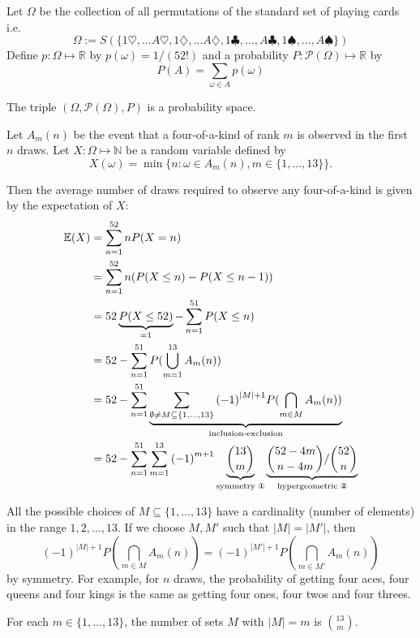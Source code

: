 \documentclass[6pt]{article}
\begin{document}
\begin{tcolorbox}[title=\text{The Standard Probability Space for Playing Cards}]
Let $\Omega$ be the collection of all permutations of the standard set of playing cards i.e.
  \[
      \Omega := S(\{1\heartsuit, \ldots A\heartsuit,1\diamondsuit,\ldots A\diamondsuit, 1\clubsuit,\ldots,A\clubsuit,1\spadesuit,\ldots,A\spadesuit\})
  \]
Define $p: \Omega \mapsto \mathbb{R}$ by $p(\omega) = 1/(52!)$
and a probability $P: \mathcal{P}(\Omega) \mapsto \mathbb{R}$  by
\[
    P(A) = \sum_{\omega \in A}p(\omega)
\]

The triple $(\Omega, \mathcal{P}(\Omega), P )$ is a probability space.
\end{tcolorbox}

\clearpage

\begin{tcolorbox}
Let $A_m(n)$ be the event that a four-of-a-kind of rank $m$ is observed in the first $n$ draws. Let
$X: \Omega \mapsto \mathbb{N}$ be a random variable defined by
\[
X(\omega) = \min \{ n : \omega \in A_m(n), m \in \{1, \ldots, 13\}\}.
\]

Then the average number of draws required to observe any four-of-a-kind is given by the expectation of $X$:
\begin{align*}
\mathbb{E}(X) &= \sum_{n = 1}^{52} n P(X  = n)\\
&= \sum_{n=1}^{52} n (P(X \leq n) - P(X \leq n -1)) \\
&= 52\underbrace{P(X \leq 52)}_{= 1} - \sum_{n=1}^{51} P(X\leq n) \\
&= 52 - \sum_{n=1}^{51} P(\bigcup_{m=1}^{13} A_m(n)) \\
& = 52 - \sum_{n=1}^{51} \underbrace{\sum_{\emptyset \neq M \subseteq \{1,\ldots,13\}} {(-1)}^{|M| + 1} P(\bigcap_{m \in M} A_m(n))}_{\text{inclusion-exclusion}} \\
& = 52 - \sum_{n = 1}^{51}\sum_{m = 1}^{13}  {(-1)}^{m+1}\underbrace{{13 \choose m}}_{\text{symmetry \ding{172}}} \underbrace{{52 -4m \choose n - 4m}/{52 \choose n}}_{\text{hypergeometric \ding{173}}} \\
\end{align*}
\end{tcolorbox}
\clearpage

\begin{tcolorbox}[title=\text{Symmetry \ding{172}}]
All the possible choices of $M \subseteq \{1, \ldots, 13\}$ have a cardinality (number of elements) in the range $1, 2, \ldots, 13$. If we choose $M, M'$ such that $|M| = |M'|$, then
\[
{(-1)}^{|M| + 1} P(\bigcap_{m \in M} A_m(n)) =  {(-1)}^{|M'| + 1} P(\bigcap_{m \in M'} A_m(n))
 \]
by symmetry. For example, for $n$ draws, the probability of getting four aces, four queens and four kings is the same as getting four ones, four twos and four threes.

For each $m \in \{1, \ldots, 13\}$, the number of sets $M$ with $|M|=m$ is ${13 \choose m}$.
\end{tcolorbox}
\end{document}
